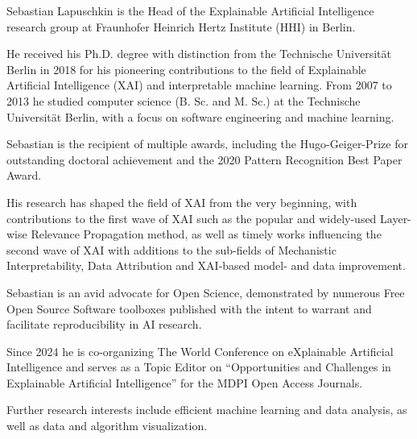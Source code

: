 
\vspace{-1.3em} %

\begin{multicols}{2}  %
\noindent

Sebastian Lapuschkin is the Head of the Explainable Artificial Intelligence research group at Fraunhofer Heinrich Hertz Institute (HHI) in Berlin.

He received his Ph.D. degree with distinction from the Technische Universität Berlin in 2018
for his pioneering contributions to the field of Explainable Artificial Intelligence (XAI) and interpretable machine learning.
From 2007 to 2013 he studied computer science (B. Sc. and M. Sc.) at the Technische Universität Berlin,
with a focus on software engineering and machine learning.

Sebastian is the recipient of multiple awards, including the Hugo-Geiger-Prize for outstanding doctoral achievement and the 2020 Pattern Recognition Best Paper Award.

His research has shaped the field of XAI from the very beginning,
with contributions to the first wave of XAI such as the popular and widely-used Layer-wise Relevance Propagation method,
as well as timely works influencing the second wave of XAI with additions to the sub-fields of Mechanistic Interpretability, Data Attribution and XAI-based model- and data improvement.

Sebastian is an avid advocate for Open Science, demonstrated by numerous Free Open Source Software toolboxes published with the intent to warrant and facilitate reproducibility in AI research.


Since 2024 he is co-organizing The World Conference on eXplainable Artificial Intelligence and serves as a Topic Editor on ``Opportunities and Challenges in Explainable Artificial Intelligence'' for the MDPI Open Access Journals.

Further research interests include efficient machine learning and data analysis, as well as data and algorithm visualization.

\end{multicols}
